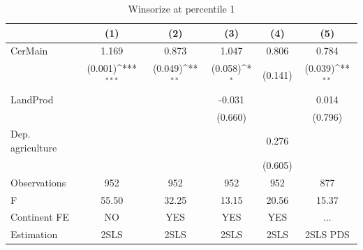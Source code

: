 \begin{table}[htbp]\centering
\def\sym#1{\ifmmode^{#1}\else\(^{#1}\)\fi}
\caption{Winsorize at percentile 1}
\begin{tabular}{l*{5}{c}}
\hline\hline
                &\multicolumn{1}{c}{(1)}         &\multicolumn{1}{c}{(2)}         &\multicolumn{1}{c}{(3)}         &\multicolumn{1}{c}{(4)}         &\multicolumn{1}{c}{(5)}         \\
\hline
CerMain         &    1.169         &    0.873         &    1.047         &    0.806         &    0.784         \\
                &  (0.001)\sym{***}&  (0.049)\sym{**} &  (0.058)\sym{*}  &  (0.141)         &  (0.039)\sym{**} \\
LandProd        &                  &                  &   -0.031         &                  &    0.014         \\
                &                  &                  &  (0.660)         &                  &  (0.796)         \\
Dep. agriculture&                  &                  &                  &    0.276         &                  \\
                &                  &                  &                  &  (0.605)         &                  \\
\hline
Observations    &      952         &      952         &      952         &      952         &      877         \\
F               &    55.50         &    32.25         &    13.15         &    20.56         &    15.37         \\
Continent FE    &       NO         &      YES         &      YES         &      YES         &      ...         \\
Estimation      &     2SLS         &     2SLS         &     2SLS         &     2SLS         & 2SLS PDS         \\
\hline\hline
\end{tabular}
\end{table}
